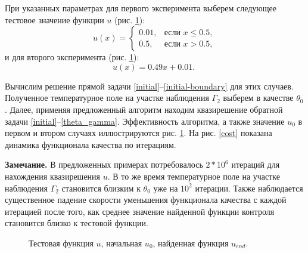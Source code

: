 \documentclass[10pt]{article}
\begin{document}
    При указанных параметрах для первого эксперимента выберем следующее тестовое значение
    функции $u$ (рис. \ref{control}):
    \begin{equation}
        u(x)=
        \begin{cases}
            0.01, & \text{если } x \le 0.5, \\
            0.5, & \text{если } x > 0.5,
        \end{cases}
    \end{equation}
    и для второго эксперимента (рис. \ref{control}):
    \begin{equation}
        \label{test_function_1}
        u(x)=0.49x+0.01. \;
    \end{equation}

    Вычислим решение прямой задачи \eqref{initial}--\eqref{initial-boundary} для этих случаев. Полученное температурное поле на участке наблюдения $\Gamma_2$ выберем в качестве $\theta_0$. Далее, применяя предложенный алгоритм находим квазирешение обратной задачи \eqref{initial}--\eqref{theta_gamma}. Эффективность алгоритма, а также значение $u_0$ в первом и втором случаях иллюстрируются рис. \ref{control}. На рис. \ref{cost} показана динамика функционала качества по итерациям.

    {\bf Замечание.} В предложенных примерах потребовалось $2*10^6$ итераций для нахождения квазирешения $u$. В то же время температурное поле на участке наблюдения $\Gamma_2$ становится близким к $\theta_0$ уже на $10^2$ итерации. Также наблюдается существенное падение скорости уменьшения функционала качества с каждой итерацией после того, как среднее значение найденной функции контроля становится близко к тестовой функции.
    \begin{figure}[H]
        \centering
        \caption{Тестовая функция $u$, начальная $u_0$, найденная функция $u_{end}.$}
        \label{control}
    \end{figure}
\end{document}

